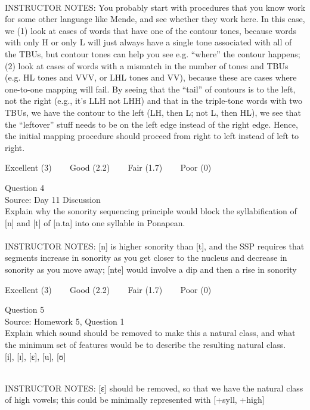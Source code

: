 \documentclass[12pt]{article}
\begin{document}
~\\
INSTRUCTOR NOTES: You probably start with procedures that you know work for some other language like Mende, and see whether they work here. In this case, we (1) look at cases of words that have one of the contour tones, because words with only H or only L will just always have a single tone associated with all of the TBUs, but contour tones can help you see e.g. “where” the contour happens; (2) look at cases of words with a mismatch in the number of tones and TBUs (e.g. HL tones and VVV, or LHL tones and VV), because these are cases where one-to-one mapping will fail. By seeing that the “tail” of contours is to the left, not the right (e.g., it’s LLH not LHH) and that in the triple-tone words with two TBUs, we have the contour to the left (LH, then L; not L, then HL), we see that the “leftover” stuff needs to be on the left edge instead of the right edge. Hence, the initial mapping procedure should proceed from right to left instead of left to right.


\vfill
Excellent (3) ~~~ Good (2.2) ~~~ Fair (1.7) ~~~ Poor (0)
\newpage

{\large Question 4}\\

Source: Day 11 Discussion\\

Explain why the sonority sequencing principle would block the syllabification of [n] and [t] of [n.ta] into one syllable in Ponapean.\\


~\\
INSTRUCTOR NOTES: [n] is higher sonority than [t], and the SSP requires that segments increase in sonority as you get closer to the nucleus and decrease in sonority as you move away; [nte] would involve a dip and then a rise in sonority


\vfill
Excellent (3) ~~~ Good (2.2) ~~~ Fair (1.7) ~~~ Poor (0)
\newpage

{\large Question 5}\\

Source: Homework 5, Question 1\\

Explain which sound should be removed to make this a natural class, and what the minimum set of features would be to describe the resulting natural class.\\

{[i]}, {[ɪ]}, {[ɛ]}, {[u]}, {[ʊ]}


~\\
INSTRUCTOR NOTES: [ɛ] should be removed, so that we have the natural class of high vowels; this could be minimally represented with [+syll, +high]
\end{document}
